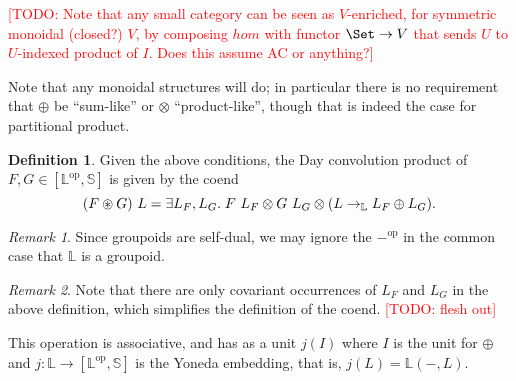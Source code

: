 \documentclass[preprint,authoryear]{sigplanconf}
\newcommand{\todo}[1]{\textcolor{red}{[TODO: #1]}}
\newcommand{\todo}[1]{}
\newcommand{\bbb}[1]{\ensuremath{\mathbb{#1}}\xspace}
\newcommand{\exist}[1]{\exists #1.\;}
\theoremstyle{definition}
\newtheorem{defn}[thm]{Definition}
\theoremstyle{remark}
\newtheorem*{rem}{Remark}
\newcommand{\op}{\ensuremath{\mathrm{op}}}            %
\newcommand{\Hom}[3][]{#2 \to_{#1} #3}
\newcommand{\coend}[1]{\exist{#1}}
\newcommand{\Lab}{\bbb{L}}
\newcommand{\Str}{\bbb{S}}
\begin{document}
\todo{Note that any small category can be seen as $V$-enriched, for
  symmetric monoidal (closed?) $V$, by composing $hom$ with functor
  $\Set \to V$ that sends $U$ to $U$-indexed product of $I$.  Does
  this assume AC or anything?}

Note that any monoidal structures will do; in particular there is no
requirement that $\oplus$ be ``sum-like'' or $\otimes$
``product-like'', though that is indeed the case for partitional
product.

\begin{defn}
  Given the above conditions, the Day convolution product of $F, G \in
  [\Lab^\op, \Str]$ is given by the coend \[ (F \oast G)\ L = \coend{L_F, L_G}
  F\ L_F \otimes G\ L_G \otimes (\Hom[\Lab]{L}{L_F \oplus L_G}). \]
\end{defn}

\begin{rem}
  Since groupoids are self-dual, we may ignore the $-^\op$ in the
  common case that $\Lab$ is a groupoid.
\end{rem}

\begin{rem}
  Note that there are only covariant occurrences of $L_F$ and $L_G$ in
  the above definition, which simplifies the definition of the
  coend. \todo{flesh out}
\end{rem}

This operation is associative, and has as a unit $j(I)$ where $I$ is
the unit for $\oplus$ and $j : \Lab \to [\Lab^{\text{op}}, \Str]$ is the Yoneda
embedding, that is, $j(L) = \Lab(-,L)$.
\end{document}
